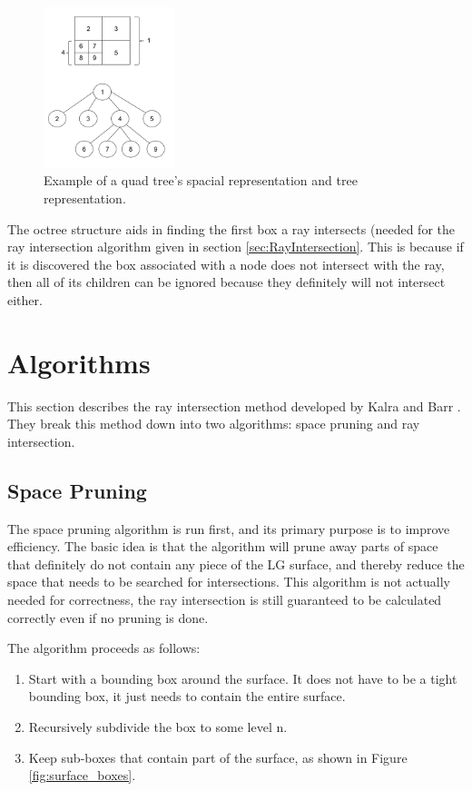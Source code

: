 \documentclass[conference]{acmsiggraph}
\begin{document}
\begin{figure}[ht]
  \centering
  \includegraphics[width=1.5in]{figures/quadtree.png}
  \caption{Example of a quad tree's spacial representation and tree representation.}
  \label{fig:quadtree}
\end{figure}

The octree structure aids in finding the first box a ray intersects (needed 
for the ray intersection algorithm given in section \ref{sec:RayIntersection}.
This is because if it is discovered the box associated with a node does not
intersect with the ray, then all of its children can be ignored because they
definitely will not intersect either.

\section{Algorithms}
\label{sec:Algorithms}

This section describes the ray intersection method developed by
Kalra and Barr \cite{KalraBarr1989}.  They break this method down into
two algorithms: space pruning and ray intersection.

\subsection{Space Pruning}
\label{sec:SpacePruning}

The space pruning algorithm is run first, and its primary purpose is to
improve efficiency.  The basic idea is that the algorithm will prune 
away parts of space that definitely do not contain any piece of the LG
surface, and thereby reduce the space that needs to be searched for 
intersections.  This algorithm is not actually needed for correctness,
the ray intersection is still guaranteed to be calculated correctly
even if no pruning is done.

The algorithm proceeds as follows:
\begin{enumerate}
	\item Start with a bounding box around the surface.  It does not
	have to be a tight bounding box, it just needs to contain the
	entire surface.
	\item Recursively subdivide the box to some level n.
	\item Keep sub-boxes that contain part of the surface, as shown
	in Figure \ref{fig:surface_boxes}.
\end{enumerate}
\end{document}
